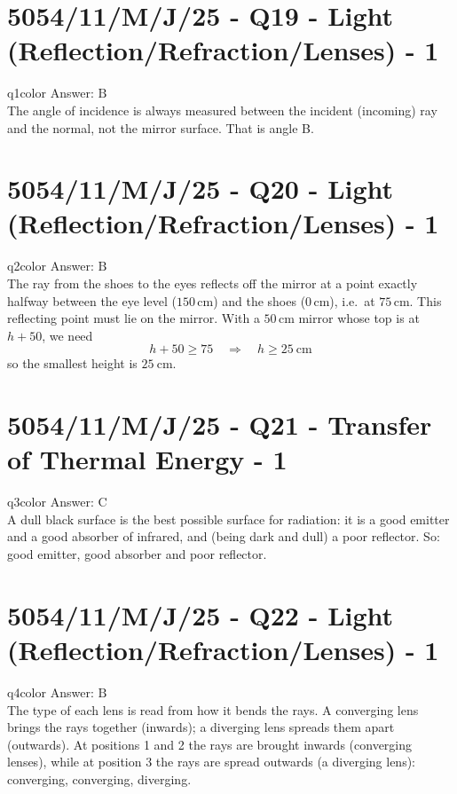 \documentclass[11pt,a4paper]{article}
\newcommand{\examq}[4]{\section[#1 - Q#2]{#1 - Q#2 - #3 - #4}}
\begin{document}
\examq{5054/11/M/J/25}{19}{Light (Reflection/Refraction/Lenses)}{1}

\begin{ansbox}{q1color}
Answer: $\boxed{\text{B}}$\\[4pt]
The angle of incidence is always measured between the incident (incoming) ray and the normal, not the mirror surface. That is angle B.
\end{ansbox}

\examq{5054/11/M/J/25}{20}{Light (Reflection/Refraction/Lenses)}{1}

\begin{ansbox}{q2color}
Answer: $\boxed{\text{B}}$\\[4pt]
The ray from the shoes to the eyes reflects off the mirror at a point exactly halfway between the eye level ($150\,\mathrm{cm}$) and the shoes ($0\,\mathrm{cm}$), i.e.\ at $75\,\mathrm{cm}$. This reflecting point must lie on the mirror. With a $50\,\mathrm{cm}$ mirror whose top is at $h + 50$, we need
\[
h + 50 \geq 75 \quad\Rightarrow\quad h \geq 25\ \mathrm{cm}
\]
so the smallest height is $\boxed{25\ \mathrm{cm}}$.
\end{ansbox}

\examq{5054/11/M/J/25}{21}{Transfer of Thermal Energy}{1}

\begin{ansbox}{q3color}
Answer: $\boxed{\text{C}}$\\[4pt]
A dull black surface is the best possible surface for radiation: it is a good emitter and a good absorber of infrared, and (being dark and dull) a poor reflector. So: good emitter, good absorber and poor reflector.
\end{ansbox}

\examq{5054/11/M/J/25}{22}{Light (Reflection/Refraction/Lenses)}{1}

\begin{ansbox}{q4color}
Answer: $\boxed{\text{B}}$\\[4pt]
The type of each lens is read from how it bends the rays. A converging lens brings the rays together (inwards); a diverging lens spreads them apart (outwards). At positions 1 and 2 the rays are brought inwards (converging lenses), while at position 3 the rays are spread outwards (a diverging lens): converging, converging, diverging.
\end{ansbox}
\end{document}
